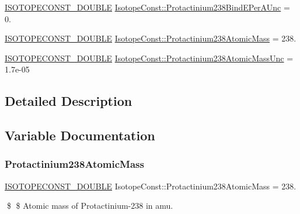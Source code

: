 \begin{DoxyCompactItemize}
\item 
\mbox{\hyperlink{group___isotope_const-_macros_ga8f45a7272ce02c0b4c65c44636ed719a}{I\+S\+O\+T\+O\+P\+E\+C\+O\+N\+S\+T\+\_\+\+D\+O\+U\+B\+LE}} \mbox{\hyperlink{group___isotope_const-_protactinium-_pa238_ga8270791aba4f1ed7661109de40b6344f}{Isotope\+Const\+::\+Protactinium238\+Bind\+E\+Per\+A\+Unc}} = 0.
\item 
\mbox{\hyperlink{group___isotope_const-_macros_ga8f45a7272ce02c0b4c65c44636ed719a}{I\+S\+O\+T\+O\+P\+E\+C\+O\+N\+S\+T\+\_\+\+D\+O\+U\+B\+LE}} \mbox{\hyperlink{group___isotope_const-_protactinium-_pa238_gaa360d5626a73c988b5cac33c0e4eb752}{Isotope\+Const\+::\+Protactinium238\+Atomic\+Mass}} = 238.
\item 
\mbox{\hyperlink{group___isotope_const-_macros_ga8f45a7272ce02c0b4c65c44636ed719a}{I\+S\+O\+T\+O\+P\+E\+C\+O\+N\+S\+T\+\_\+\+D\+O\+U\+B\+LE}} \mbox{\hyperlink{group___isotope_const-_protactinium-_pa238_gadb69b365c4e1eb897e55aa0e27548e71}{Isotope\+Const\+::\+Protactinium238\+Atomic\+Mass\+Unc}} = 1.\+7e-\/05
\end{DoxyCompactItemize}


\subsection{Detailed Description}


\subsection{Variable Documentation}
\mbox{\label{group___isotope_const-_protactinium-_pa238_gaa360d5626a73c988b5cac33c0e4eb752}} 
\subsubsection{\texorpdfstring{Protactinium238\+Atomic\+Mass}{Protactinium238AtomicMass}}
{\footnotesize\ttfamily \mbox{\hyperlink{group___isotope_const-_macros_ga8f45a7272ce02c0b4c65c44636ed719a}{I\+S\+O\+T\+O\+P\+E\+C\+O\+N\+S\+T\+\_\+\+D\+O\+U\+B\+LE}} Isotope\+Const\+::\+Protactinium238\+Atomic\+Mass = 238.}

\$ \$ Atomic mass of Protactinium-\/238 in amu. \mbox{\label{group___isotope_const-_protactinium-_pa238_gadb69b365c4e1eb897e55aa0e27548e71}} 
